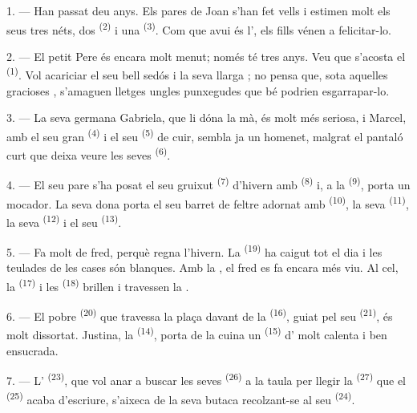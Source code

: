 1. --- Han passat deu anys. Els pares de Joan s'han fet vells i estimen molt els seus tres
néts, dos  \textsuperscript{(2)} i una  \textsuperscript{(3)}. Com
que avui és l', els fills vénen a felicitar-lo.

2. --- El petit Pere és encara molt menut; només té tres anys. Veu que s'acosta el
 \textsuperscript{(1)}. Vol acariciar el seu bell  sedós i la seva
llarga ; no pensa que, sota aquelles gracioses
, s'amaguen lletges ungles punxegudes que bé podrien esgarrapar-lo.

3. --- La seva germana Gabriela, que li dóna la mà, és molt més seriosa, i Marcel, amb el seu
gran  \textsuperscript{(4)} i el seu
 \textsuperscript{(5)} de cuir, sembla ja un homenet, malgrat el
pantaló curt que deixa veure les seves  \textsuperscript{(6)}.

4. --- El seu pare s'ha posat el seu gruixut  \textsuperscript{(7)} d'hivern
amb  \textsuperscript{(8)} i, a la 
\textsuperscript{(9)}, porta un mocador. La seva dona porta el seu barret de feltre adornat
amb  \textsuperscript{(10)}, la seva  \textsuperscript{(11)},
la seva  \textsuperscript{(12)} i el seu 
\textsuperscript{(13)}.

5. --- Fa molt de fred, perquè regna l'hivern. La  \textsuperscript{(19)} ha
caigut tot el dia i les teulades de les cases són blanques. Amb la , el fred es fa
encara més viu. Al cel, la
 \textsuperscript{(17)} i les 
\textsuperscript{(18)} brillen i travessen la .

\VUsaut{4.2mm}
\VUsaut{3.0mm}

6. --- El pobre  \textsuperscript{(20)} que travessa la plaça davant de la
 \textsuperscript{(16)}, guiat pel seu 
\textsuperscript{(21)}, és molt dissortat. Justina, la  \textsuperscript{(14)},
porta de la cuina un  \textsuperscript{(15)} d' molt calenta i ben
ensucrada.

7. --- L' \textsuperscript{(23)}, que vol anar a buscar les seves
 \textsuperscript{(26)} a la taula per llegir la 
\textsuperscript{(27)} que el  \textsuperscript{(25)} acaba d'escriure, s'aixeca
de la seva butaca recolzant-se al seu  \textsuperscript{(24)}.

